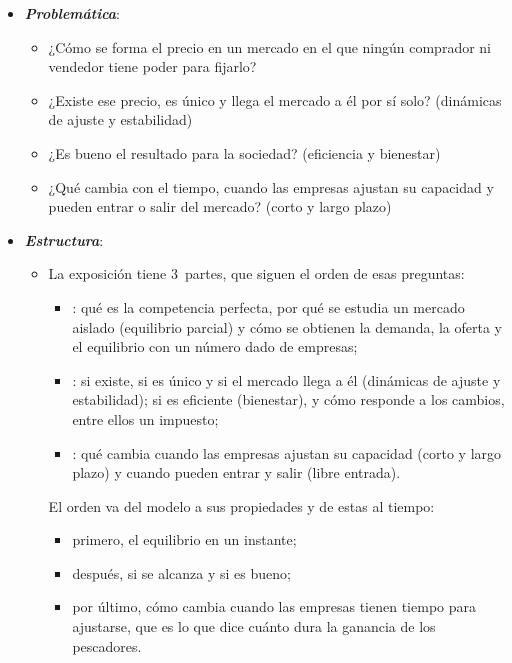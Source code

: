 \documentclass[11pt]{article}
\begin{document}
\begin{itemize}
\item \textbf{\emph{Problemática}}:
  \begin{itemize}
  \item ¿Cómo se forma el precio en un mercado en el que ningún comprador ni vendedor tiene poder para fijarlo?
  \item ¿Existe ese precio, es único y llega el mercado a él por sí solo? (dinámicas de ajuste y estabilidad)
  \item ¿Es bueno el resultado para la sociedad? (eficiencia y bienestar)
  \item ¿Qué cambia con el tiempo, cuando las empresas ajustan su capacidad y pueden entrar o salir del mercado? (corto y largo plazo)
  \end{itemize}

\item \textbf{\emph{Estructura}}:
  \begin{itemize}
  \item La exposición tiene 3~partes, que siguen el orden de esas preguntas:
  \begin{itemize}
  \item {}: qué es la competencia perfecta, por qué se estudia un mercado aislado (equilibrio parcial) y cómo se obtienen la demanda, la oferta y el equilibrio con un número dado de empresas;
  \item {}: si existe, si es único y si el mercado llega a él (dinámicas de ajuste y estabilidad); si es eficiente (bienestar), y cómo responde a los cambios, entre ellos un impuesto;
  \item {}: qué cambia cuando las empresas ajustan su capacidad (corto y largo plazo) y cuando pueden entrar y salir (libre entrada).
  \end{itemize}
  El orden va del modelo a sus propiedades y de estas al tiempo:
  \begin{itemize}
  \item primero, el equilibrio en un instante;
  \item después, si se alcanza y si es bueno;
  \item por último, cómo cambia cuando las empresas tienen tiempo para ajustarse, que es lo que dice cuánto dura la ganancia de los pescadores.
  \end{itemize}
  \end{itemize}
\end{itemize}
\end{document}
